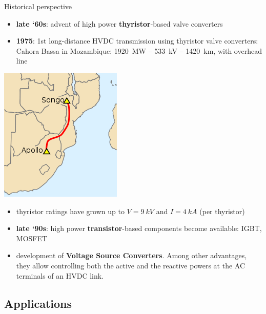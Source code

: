 \begin{frame}[allowframebreaks]{Historical perspective}
\begin{itemize}
    \item \textbf{late ‘60s}: advent of high power \textbf{thyristor}-based valve converters
    \item \textbf{1975}: 1st long-distance HVDC transmission using thyristor valve converters: Cahora Bassa in Mozambique: \SI{1920}{MW} -- \SI{533}{kV} -- \SI{1420}{km}, with overhead line
\end{itemize}
\begin{center}
    \includegraphics[width=0.2\linewidth]{images/Cahora_Bassa.png}
\end{center}
\begin{itemize}
    \item thyristor ratings have grown up to $V=\SI{9}{kV}$ and $I=\SI{4}{kA}$ (per thyristor)
    \item \textbf{late ‘90s}: high power \textbf{transistor}-based components become available: IGBT, MOSFET
    \item development of \textbf{Voltage Source Converters}. Among other advantages, they allow controlling both the active and the reactive powers at the AC terminals of an HVDC link.
\end{itemize}
\end{frame}


\subsection{Applications}

